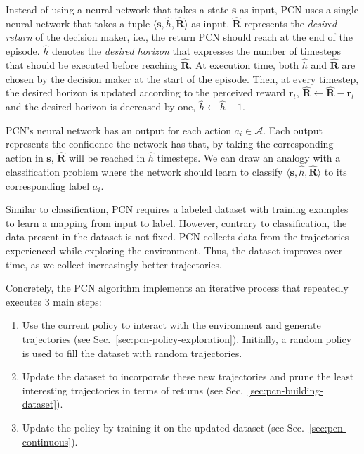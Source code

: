 \documentclass{article}
\newcommand{\mdpstate}{\mathbf{s}}
\newcommand{\momdpreward}{\mathbf{r}}
\newcommand{\action}{a}
\newcommand{\ltuple}{\langle}
\newcommand{\rtuple}{\rangle}
\begin{document}
Instead of using a neural network that takes a state $\mdpstate$ as input, PCN uses a single neural network that takes a tuple $\ltuple \mdpstate, \hat{h}, \mathbf{\hat{R}} \rtuple$ as input. $\mathbf{\hat{R}}$ represents the \emph{desired return} of the decision maker, i.e., the return PCN should reach at the end of the episode. $\hat{h}$ denotes the \emph{desired horizon} that expresses the number of timesteps that should be executed before reaching $\mathbf{\hat{R}}$. At execution time, both $\hat{h}$ and $\mathbf{\hat{R}}$ are chosen by the decision maker at the start of the episode. Then, at every timestep, the desired horizon is updated according to the perceived reward $\momdpreward_t$, $\mathbf{\hat{R}} \leftarrow \mathbf{\hat{R}} - \momdpreward_t$ and the desired horizon is decreased by one, $\hat{h} \leftarrow \hat{h}-1$.

PCN's neural network has an output for each action $\action_i \in \mathcal{A}$. Each output represents the confidence the network has that, by taking the corresponding action in $\mdpstate$, $\mathbf{\hat{R}}$ will be reached in $\hat{h}$ timesteps. We can draw an analogy with a classification problem where the network should learn to classify $\ltuple \mdpstate, \hat{h}, \mathbf{\hat{R}}\rtuple$ to its corresponding label $\action_i$.

Similar to classification, PCN requires a labeled dataset with training examples to learn a mapping from input to label. However, contrary to classification, the data present in the dataset is not fixed. PCN collects data from the trajectories experienced while exploring the environment. Thus, the dataset improves over time, as we collect increasingly better trajectories.

Concretely, the PCN algorithm implements an iterative process that repeatedly executes 3 main steps:
\begin{enumerate}
    \item Use the current policy to interact with the environment and generate trajectories (see Sec.~\ref{sec:pcn-policy-exploration}). Initially, a random policy is used to fill the dataset with random trajectories.
    \item Update the dataset to incorporate these new trajectories and prune the least interesting trajectories in terms of returns (see Sec.~\ref{sec:pcn-building-dataset}).
    \item Update the policy by training it on the updated dataset (see Sec.~\ref{sec:pcn-continuous}).
\end{enumerate}
\end{document}
